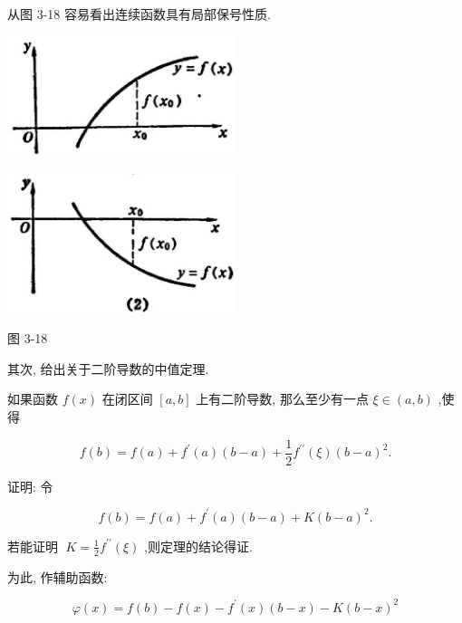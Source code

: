 \documentclass[lang=cn,newtx,10pt,scheme=chinese]{elegantbook}
\begin{document}
从图 3-18 容易看出连续函数具有局部保号性质.

\begin{center}
\includegraphics[max width=0.5\textwidth]{images/01912c18-5c3f-733d-b775-749ba9897a9d_160_145040.jpg}
\end{center}

\begin{center}
\includegraphics[max width=0.5\textwidth]{images/01912c18-5c3f-733d-b775-749ba9897a9d_160_221128.jpg}
\end{center}

图 3-18

其次, 给出关于二阶导数的中值定理.

\begin{theorem}[二阶导数中值定理]

如果函数 \(f\left( x\right)\) 在闭区间 \(\left\lbrack {a,b}\right\rbrack\) 上有二阶导数, 那么至少有一点 \(\xi \in \left( {a,b}\right)\) ,使得

\[
f\left( b\right) = f\left( a\right) + {f}^{\prime }\left( a\right) \left( {b - a}\right) + \frac{1}{2}{f}^{\prime \prime }\left( \xi \right) {\left( b - a\right) }^{2}. \tag{1}
\]

\end{theorem}

证明: 令

\[
f\left( b\right) = f\left( a\right) + {f}^{\prime }\left( a\right) \left( {b - a}\right) + K{\left( b - a\right) }^{2}. \tag{2}
\]

若能证明 \(\;K = \frac{1}{2}{f}^{\prime \prime }\left( \xi \right)\) ,则定理的结论得证.

为此, 作辅助函数:

\[
\varphi \left( x\right) = f\left( b\right) - f\left( x\right) - {f}^{\prime }\left( x\right) \left( {b - x}\right) - K{\left( b - x\right) }^{2} \tag{3}
\]
\end{document}
